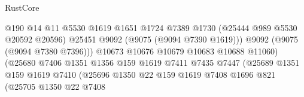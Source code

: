\begin{lexlean}{RustCore}
\begin{coremodule}
                                                  @190
                                                  @14
                                                  @11
                                                  @5530
                                                  @1619
                                                  @1651
                                                  @1724
                                                  @7389
                                                  @1730
                                                  (@25444 @989 @5530 @20592 @20596)
                                                  @25451
                                                  @9092
                                                  (@9075 (@9094 @7390 @1619)))
                                                @9092
                                                (@9075 (@9094 @7380 @7396)))
                                              @10673
                                              @10676
                                              @10679
                                              @10683
                                              @10688
                                              @11060)
                                            (@25680
                                              @7406
                                              @1351
                                              @1356
                                              @159
                                              @1619
                                              @7411
                                              @7435
                                              @7447
                                              (@25689
                                                @1351
                                                @159
                                                @1619
                                                @7410
                                                (@25696
                                                  @1350
                                                  @22
                                                  @159
                                                  @1619
                                                  @7408
                                                  @1696
                                                  @821
                                                  (@25705
                                                    @1350
                                                    @22
                                                    @7408

\end{coremodule}
\end{lexlean}
